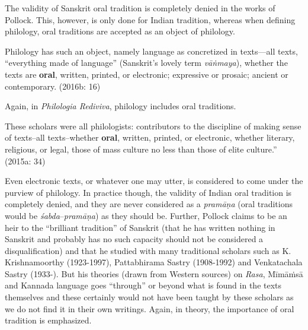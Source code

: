 \vspace{-.2cm}

The validity of Sanskrit oral tradition is completely denied in the works of Pollock. This, however, is only done for Indian tradition, whereas when defining philology, oral traditions are accepted as an object of philology.

\begin{myquote}
Philology has such an object, namely language as concretized in texts—all texts, “everything made of language” (Sanskrit’s lovely term \textit{vāṅmaya}), whether the texts are \textbf{oral}, written, printed, or electronic; expressive or prosaic; ancient or contemporary. (2016b: 16)
\end{myquote}

Again, in \textit{Philologia Rediviva}, philology includes oral traditions.

\begin{myquote}
These scholars were all philologists: contributors to the discipline of making sense of texts–all texts–whether \textbf{oral}, written, printed, or electronic, whether literary, religious, or legal, those of mass culture no less than those of elite culture.” (2015a: 34)
\end{myquote}

Even electronic texts, or whatever one may utter, is considered to come under the purview of philology. In practice though, the validity of Indian oral tradition is completely denied, and they are never considered as a \textit{pramāṇa} (oral traditions would be \textit{śabda}–\textit{pramāṇa}) as they should be. Further, Pollock claims to be an heir to the “brilliant tradition” of Sanskrit (that he has written nothing in Sanskrit and probably has no such capacity should not be considered a disqualification) and that he studied with many traditional scholars such as K. Krishnamoorthy (1923-1997), Pattabhirama Sastry (1908-1992) and Venkatachala Sastry (1933-). But his theories (drawn from Western sources) on \textit{Rasa}, Mīmāṁsā and Kannada language goes “through” or beyond what is found in the texts themselves and these certainly would not have been taught by these scholars as we do not find it in their own writings. Again, in theory, the importance of oral tradition is emphasized.

